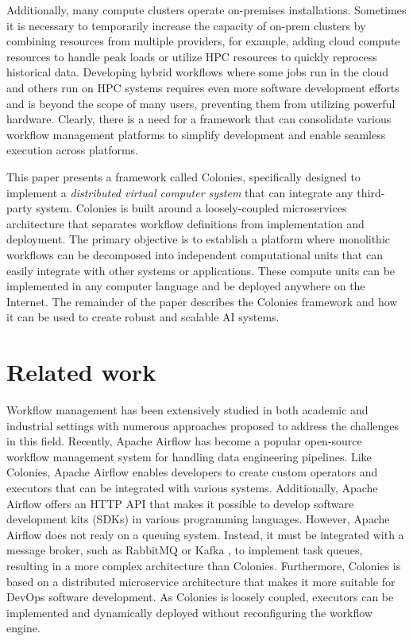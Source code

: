 \documentclass{article}
\begin{document}
Additionally, many compute clusters operate on-premises installations. Sometimes it is necessary to temporarily increase the capacity of on-prem clusters by combining resources from multiple providers, for example, adding cloud compute resources to handle peak loads or utilize HPC resources to quickly reprocess historical data. Developing hybrid workflows where some jobs run in the cloud and others run on HPC systems requires even more software development efforts \cite{wf_challenges} and is beyond the scope of many users, preventing them from utilizing powerful hardware. Clearly, there is a need for a framework that can consolidate various workflow management platforms to simplify development and enable seamless execution across platforms.

This paper presents a framework called Colonies, specifically designed to implement a \emph{distributed virtual computer system} that can integrate any third-party system. Colonies is built around a loosely-coupled microservices architecture that separates workflow definitions from implementation and deployment. The primary objective is to establish a platform where monolithic workflows can be decomposed into independent computational units that can easily integrate with other systems or applications. These compute units can be implemented in any computer language and be deployed anywhere on the Internet. The remainder of the paper describes the Colonies framework and how it can be used to create robust and scalable AI systems. 

\section{Related work}
Workflow management has been extensively studied in both academic and industrial settings with numerous approaches \cite{service_wfs, schmitt2022workflow, GarciaRepresa1740746, Ouyang2010, NIKOLOV2021100440, workflow_in_bigdata} proposed to address the challenges in this field. Recently, Apache Airflow \cite{apache_airflow} has become a popular open-source workflow management system for handling data engineering pipelines. Like Colonies, Apache Airflow enables developers to create custom operators and executors that can be integrated with various systems. Additionally, Apache Airflow offers an HTTP API that makes it possible to develop software development kits (SDKs) in various programming languages. However, Apache Airflow does not realy on a queuing system. Instead, it must be integrated with a message broker, such as RabbitMQ \cite{rabbitmq} or Kafka \cite{apache_kafka}, to implement task queues, resulting in a more complex architecture than Colonies. Furthermore, Colonies is based on a distributed microservice architecture that makes it more suitable for DevOps software development. As Colonies is loosely coupled, executors can be implemented and dynamically deployed without reconfiguring the workflow engine.
\end{document}

